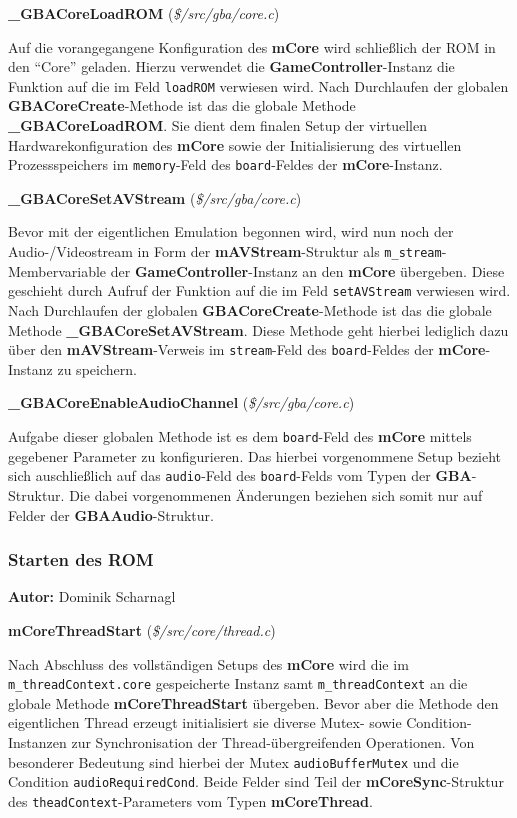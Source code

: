\documentclass[11pt,a4paper]{scrartcl}
\newcommand{\AutorDominik} {
    \vspace{-4mm}
    \large \textbf{Autor:} Dominik Scharnagl \normalsize
    \vspace{2mm}
}
\newcommand{\paratitlecode}[2] {
    \vspace{5mm}
    \large \textbf{#1} \normalsize(\textit{\${#2}})
    \vspace{2mm}\newline
}
\begin{document}
\paratitlecode{{\_}GBACoreLoadROM}{/src/gba/core.c}
Auf die vorangegangene Konfiguration des \textbf{mCore} wird schlie{\ss}lich der ROM in den \enquote{Core} geladen. Hierzu verwendet die \textbf{GameController}-Instanz die Funktion auf die im Feld \verb|loadROM| verwiesen wird. Nach Durchlaufen der globalen \textbf{GBACoreCreate}-Methode ist das die globale Methode \textbf{{\_}GBACoreLoadROM}. Sie dient dem finalen Setup der virtuellen Hardwarekonfiguration des \textbf{mCore} sowie der Initialisierung des virtuellen Prozessspeichers im \verb|memory|-Feld des \verb|board|-Feldes der \textbf{mCore}-Instanz.

\paratitlecode{{\_}GBACoreSetAVStream}{/src/gba/core.c}
Bevor mit der eigentlichen Emulation begonnen wird, wird nun noch der Audio-/Videostream in Form der \textbf{mAVStream}-Struktur als \verb|m_stream|-Membervariable der \textbf{GameController}-Instanz an den \textbf{mCore} \"ubergeben. Diese geschieht durch Aufruf der Funktion auf die im Feld \verb|setAVStream| verwiesen wird. Nach Durchlaufen der globalen \textbf{GBACoreCreate}-Methode ist das die globale Methode \textbf{{\_}GBACoreSetAVStream}. Diese Methode geht hierbei lediglich dazu \"uber den \textbf{mAVStream}-Verweis im \verb|stream|-Feld des \verb|board|-Feldes der \textbf{mCore}-Instanz zu speichern.

\paratitlecode{{\_}GBACoreEnableAudioChannel}{/src/gba/core.c}
Aufgabe dieser globalen Methode ist es dem \verb|board|-Feld des \textbf{mCore} mittels gegebener Parameter zu konfigurieren. Das hierbei vorgenommene Setup bezieht sich auschlie{\ss}lich auf das \verb|audio|-Feld des \verb|board|-Felds vom Typen der \textbf{GBA}-Struktur. Die dabei vorgenommenen \"Anderungen beziehen sich somit nur auf Felder der \textbf{GBAAudio}-Struktur.


\newpage
\subsubsection{Starten des ROM}
\AutorDominik

\paratitlecode{mCoreThreadStart}{/src/core/thread.c}
Nach Abschluss des vollst\"andigen Setups des \textbf{mCore} wird die im \verb|m_threadContext.core| gespeicherte Instanz samt \verb|m_threadContext| an die globale Methode \textbf{mCoreThreadStart} \"ubergeben. Bevor aber die Methode den eigentlichen Thread erzeugt initialisiert sie diverse Mutex- sowie Condition-Instanzen zur Synchronisation der Thread-\"ubergreifenden Operationen. Von besonderer Bedeutung sind hierbei der Mutex \verb|audioBufferMutex| und die Condition \verb|audioRequiredCond|. Beide Felder sind Teil der \textbf{mCoreSync}-Struktur des \verb|theadContext|-Parameters vom Typen \textbf{mCoreThread}.
\end{document}
